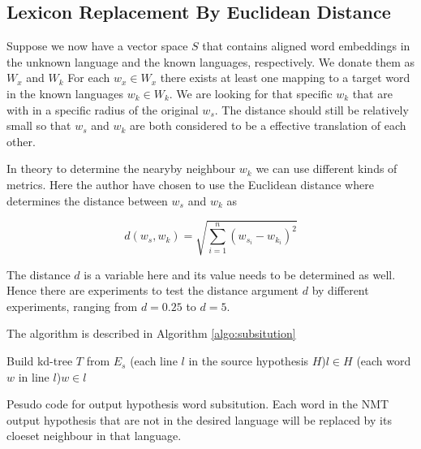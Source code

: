 \documentclass[thesis,fonts=libertine]{cluu}
\begin{document}
\subsection{Lexicon Replacement By Euclidean Distance}

Suppose we now have a vector space $S$ that contains aligned word embeddings in the unknown language and the known languages, respectively. We donate them as $W_x$ and $W_k$ For each $w_x\in W_x$ there exists at least one mapping to a target word in the known languages $w_k \in W_k$. We are looking for that specific $w_k$ that are with in a specific radius of the original $w_s$. The distance should still be relatively small so that $w_s$ and $w_k$ are both considered to be a effective translation of each other.

In theory to determine the nearyby neighbour $w_k$ we can use different kinds of metrics. Here the author have chosen to use the Euclidean distance where determines the distance between $w_s$ and $w_k$ as

\begin{equation}
  d(w_s, w_k)=\sqrt{\sum_{i=1}^n{(w_{s_i}-w_{k_i})}^2}
\end{equation}

The distance $d$ is a variable here and its value needs to be determined as well. Hence there are experiments to test the distance argument $d$ by different experiments, ranging from $d=0.25$ to $d=5$.

The algorithm is described in Algorithm \ref{algo:subsitution}

\begin{algorithm}[H]
  \SetAlgoLined

  Build kd-tree $T$ from $E_s$
  \For(each line $l$ in the source hypothesis $H$){$l \in H$}{
    \For(each word $w$ in line $l$){$w \in l$}{
    }
  }
  \caption{Pesudo code for output hypothesis word subsitution. Each word in the NMT output hypothesis that are not in the desired language will be replaced by its cloeset neighbour in that language.}
  \label{algo:subsitution}
\end{algorithm}
\end{document}
